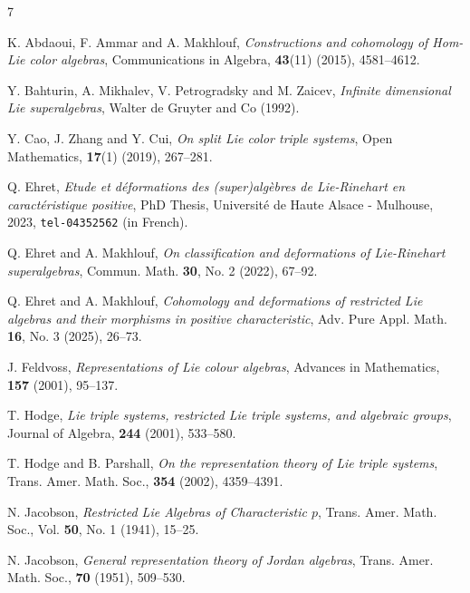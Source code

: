 \documentclass[11pt, twoside]{article}
\begin{document}
	\begin{thebibliography}{7}


        K. Abdaoui, F. Ammar and A. Makhlouf,
        \emph{Constructions and cohomology of  Hom-Lie color algebras}, 
         Communications in Algebra, {\bf 43}(11) (2015), 4581--4612.

        Y. Bahturin, A. Mikhalev, V. Petrogradsky and M. Zaicev,
        \emph{Infinite dimensional Lie superalgebras}, Walter de Gruyter and Co (1992).

        Y. Cao, J. Zhang and Y. Cui,
        \emph{On split Lie color triple systems},  Open Mathematics, {\bf 17}(1) (2019), 267–281.


        
	   Q. Ehret,
	   \emph{Etude et déformations des (super)algèbres de Lie-Rinehart en caractéristique        positive}, PhD Thesis,
        Université de Haute Alsace - Mulhouse, 2023, \texttt{tel-04352562} (in French).



	   Q. Ehret and A. Makhlouf,
	   \emph{
On classification and deformations of Lie-Rinehart superalgebras},
Commun. Math. {\bf 30}, No. 2 (2022), 67--92.

	   Q. Ehret and A. Makhlouf,
	   \emph{
Cohomology and deformations of restricted Lie algebras and their morphisms in positive characteristic},
Adv. Pure Appl. Math. {\bf 16}, No. 3 (2025), 26--73.


        J. Feldvoss, 
        \emph{Representations of Lie colour algebras}, Advances in Mathematics, {\bf 157} (2001), 95--137.

        T. Hodge,
        \emph{Lie triple systems, restricted Lie triple systems, and algebraic groups}, Journal of Algebra, {\bf 244} (2001), 533--580.

        T. Hodge and B. Parshall,
        \emph{On the representation theory of Lie triple systems}, Trans. Amer. Math. Soc., {\bf 354} (2002), 4359--4391.

        N. Jacobson,
        \emph{Restricted Lie Algebras of Characteristic $p$}, Trans. Amer. Math. Soc., Vol. {\bf 50}, No. 1 (1941), 15--25.


        N. Jacobson,
        \emph{General representation theory of Jordan algebras}, Trans. Amer. Math. Soc., {\bf 70} (1951), 509--530.


\end{thebibliography}
\end{document}
